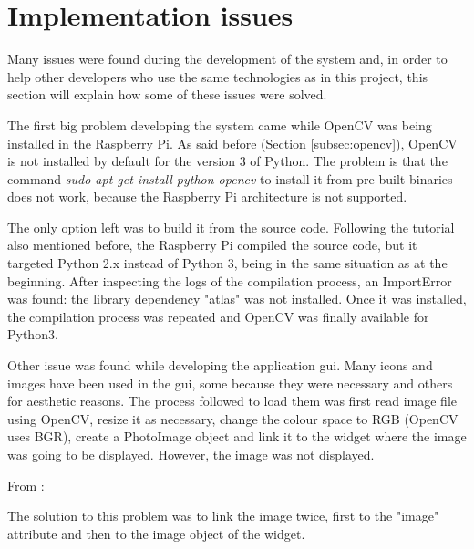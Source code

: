 \section{Implementation issues}
Many issues were found during the development of the system and, in order to help other developers who use the same technologies as in this project, this section will explain how some of these issues were solved.

The first big problem developing the system came while OpenCV was being installed in the Raspberry Pi. As said before (Section \ref{subsec:opencv}), OpenCV is not installed by default for the version 3 of Python. The problem is that the command \textit{sudo apt-get install python-opencv} to install it from pre-built binaries does not work, because the Raspberry Pi architecture is not supported. 

The only option left was to build it from the source code. Following the tutorial also mentioned before, the Raspberry Pi compiled the source code, but it targeted Python 2.x instead of Python 3, being in the same situation as at the beginning. After inspecting the logs of the compilation process, an ImportError was found: the library dependency "atlas" was not installed. Once it was installed, the compilation process was repeated and OpenCV was finally available for Python3.

Other issue was found while developing the application \gls{gui}. Many icons and images have been used in the \gls{gui}, some because they were necessary and others for aesthetic reasons. The process followed to load them was first read image file using OpenCV, resize it as necessary, change the colour space to RGB (OpenCV uses BGR), create a PhotoImage object and link it to the widget where the image was going to be displayed. However, the image was not displayed. 

From \cite{tkinter_images_double_ref}:


The solution to this problem was to link the image twice, first to the "image" attribute and then to the image object of the widget.

